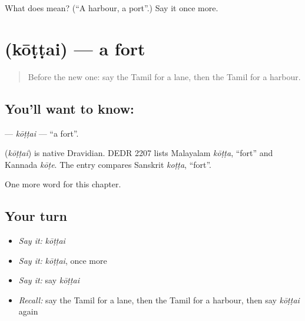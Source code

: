 \begin{tcolorbox}[breakable,colback=teal!4,colframe=teal!35!black,title={Before you move on}]
What does  mean? (\textquotedblleft{}A harbour, a port\textquotedblright{}.) Say it once more.
\end{tcolorbox}
\section[\texorpdfstring{\ta{கோட்டை} (kōṭṭai)}{கோட்டை (kōṭṭai)}]{ (kōṭṭai) — a fort}

\label{lesson:TA-C236-kottai}



\begin{quote}
Before the new one: say the Tamil for a lane, then the Tamil for a harbour.
\end{quote}

\subsection*{You'll want to know: }
\textbf{} — \emph{kōṭṭai} — \textquotedblleft{}a fort\textquotedblright{}.

\begin{cousinweb}
\textbf{} (\emph{kōṭṭai}) is native Dravidian. DEDR 2207 lists Malayalam \emph{kōṭṭa}, \textquotedblleft{}fort\textquotedblright{} and Kannada \emph{kōṭe}. The entry compares Sanskrit \emph{koṭṭa}, \textquotedblleft{}fort\textquotedblright{}.
\end{cousinweb}

\begin{grammarlens}[title={What you've built}]
One more word for this chapter.
\end{grammarlens}

\subsection*{Your turn}
\begin{itemize}
\raggedright
  \item \emph{Say it:} \emph{kōṭṭai}
  \item \emph{Say it:} \emph{kōṭṭai}, once more
  \item \emph{Say it:} say \emph{kōṭṭai}
  \item \emph{Recall:} say the Tamil for a lane, then the Tamil for a harbour, then say \emph{kōṭṭai} again
\end{itemize}

